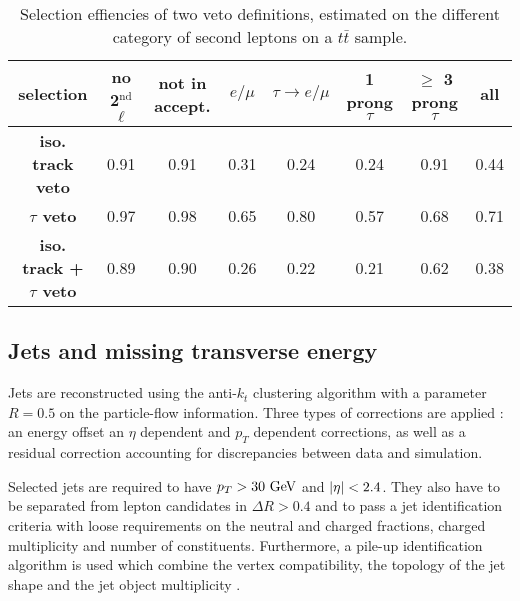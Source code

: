         \begin{table}
        \hspace*{-1.2cm}
        \begin{tabular}{|c|c|cccccc|}
            \hline
            \textbf{selection}                  & no 2$^\text{nd}$ $\ell$ & not in accept. & $e/\mu$ & $\tau \rightarrow e/\mu$ & 1 prong $\tau $&$\geq$ 3 prong $\tau$ & all \\
            \hline
            \textbf{iso. track veto}            & 0.91                    & 0.91  & 0.31  & 0.24  & 0.24  & 0.91  & 0.44  \\  
            \textbf{$\tau$ veto}                & 0.97                    & 0.98  & 0.65  & 0.80  & 0.57  & 0.68  & 0.71  \\
            \hline
            \textbf{iso. track + $\tau$ veto}   & 0.89                    & 0.90  & 0.26  & 0.22  & 0.21  & 0.62  & 0.38 \\
            \hline
        \end{tabular}
            \caption{Selection effiencies of two veto definitions, estimated on the different category of second leptons on a $t\bar{t}$ sample.}
            \label{tab:secondLeptonVetoPerformances}
        \end{table}

        \subsection{Jets and missing transverse energy}

       Jets are reconstructed using the anti-$k_t$ clustering algorithm with a parameter $R = 0.5$ on the particle-flow
       information. Three types of corrections are applied : an energy offset an $\eta$ dependent and $p_T$ dependent
       corrections, as well as a residual correction accounting for discrepancies between data and simulation.

       Selected jets are required to have $p_T > 30 ~\text{GeV}$ and $\left| \eta \right| < 2.4$. They also have to be separated from
       lepton candidates in $\Delta R > 0.4$ and to pass a jet identification criteria  with loose
       requirements on the neutral and charged fractions, charged multiplicity and number of constituents. Furthermore,
       a pile-up identification algorithm is used which combine the vertex compatibility, the topology of the jet shape 
       and the jet object multiplicity .

